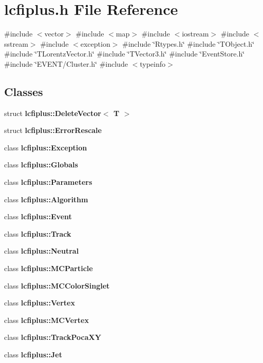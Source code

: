 \section{lcfiplus.\+h File Reference}
\label{lcfiplus_8h}
{\ttfamily \#include $<$vector$>$}\newline
{\ttfamily \#include $<$map$>$}\newline
{\ttfamily \#include $<$iostream$>$}\newline
{\ttfamily \#include $<$sstream$>$}\newline
{\ttfamily \#include $<$exception$>$}\newline
{\ttfamily \#include \char`\"{}Rtypes.\+h\char`\"{}}\newline
{\ttfamily \#include \char`\"{}T\+Object.\+h\char`\"{}}\newline
{\ttfamily \#include \char`\"{}T\+Lorentz\+Vector.\+h\char`\"{}}\newline
{\ttfamily \#include \char`\"{}T\+Vector3.\+h\char`\"{}}\newline
{\ttfamily \#include \char`\"{}Event\+Store.\+h\char`\"{}}\newline
{\ttfamily \#include \char`\"{}E\+V\+E\+N\+T/\+Cluster.\+h\char`\"{}}\newline
{\ttfamily \#include $<$typeinfo$>$}\newline
\subsection*{Classes}
\begin{DoxyCompactItemize}
\item 
struct \textbf{ lcfiplus\+::\+Delete\+Vector$<$ T $>$}
\item 
struct \textbf{ lcfiplus\+::\+Error\+Rescale}
\item 
class \textbf{ lcfiplus\+::\+Exception}
\item 
class \textbf{ lcfiplus\+::\+Globals}
\item 
class \textbf{ lcfiplus\+::\+Parameters}
\item 
class \textbf{ lcfiplus\+::\+Algorithm}
\item 
class \textbf{ lcfiplus\+::\+Event}
\item 
class \textbf{ lcfiplus\+::\+Track}
\item 
class \textbf{ lcfiplus\+::\+Neutral}
\item 
class \textbf{ lcfiplus\+::\+M\+C\+Particle}
\item 
class \textbf{ lcfiplus\+::\+M\+C\+Color\+Singlet}
\item 
class \textbf{ lcfiplus\+::\+Vertex}
\item 
class \textbf{ lcfiplus\+::\+M\+C\+Vertex}
\item 
class \textbf{ lcfiplus\+::\+Track\+Poca\+XY}
\item 
class \textbf{ lcfiplus\+::\+Jet}
\end{DoxyCompactItemize}
